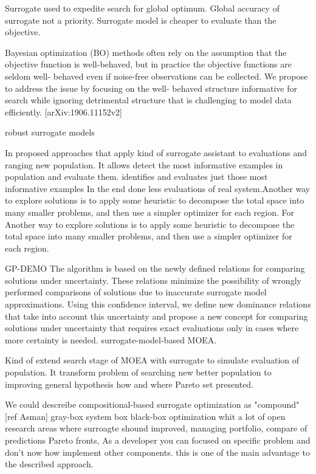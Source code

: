        Surrogate used to expedite search for global optimum. Global accuracy of surrogate
        not a priority. Surrogate model is cheaper to evaluate than the objective.

        Bayesian optimization (BO) methods often rely on the assumption that the objective function 
        is well-behaved, but in practice the objective functions are seldom well- behaved even if 
        noise-free observations can be collected. We propose to address the issue by focusing on 
        the well- behaved structure informative for search while ignoring detrimental structure 
        that is challenging to model data efficiently. [arXiv:1906.11152v2]

        robust surrogate models

        In \cite{KrallMD15} proposed approaches that apply kind of surrogate assistant to evaluations and ranging new 
        population. It allows detect the most informative examples in population and evaluate them. 
        identifies and evaluates just those most informative examples
        In the end done less evaluations of real system.Another way to explore solutions is to apply some heuristic to decompose the total space into many smaller problems, and then use a simpler optimizer for each region. For
        Another way to explore solutions is to apply some heuristic to 
        decompose the total space into many smaller problems, and then use a simpler optimizer for each region. 
        
        GP-DEMO \cite{MlakarPTF15} The algorithm is based on the newly defined relations for comparing solutions under uncertainty. 
        These relations minimize the possibility of wrongly performed comparisons of solutions due to inaccurate 
        surrogate model approximations. Using this confidence interval, we define new dominance relations that take into account 
        this uncertainty and propose a new concept for comparing solutions under uncertainty that requires exact evaluations 
        only in cases where more certainty is needed.
        surrogate-model-based MOEA.

        Kind of extend search stage of MOEA with surrogate to simulate evaluation of population. It transform
        problem of searching new better population to improving general hypothesis how and where Pareto set presented.  
        
        We could descreibe compositional-based surrogate optimization as "compound"[ref Asman] gray-box system box black-box optimization
        whit a lot of open research areas where surroagte shound improved, managing portfolio, compare of predictions Pareto fronts,
        As a developer you can focused on specific problem and don't now how implement other components. 
        this is one of the main advantage to the described approach.

